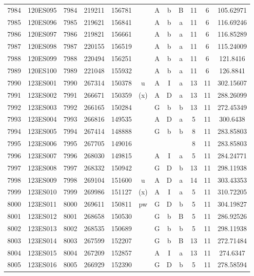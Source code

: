 \begin{tabular}{|*{12}{c|}}
7984 & 120ES095 & 7984 & 219211 & 156781 &  & A & b & B & 11 & 6 & 105.62971 \\ 
7985 & 120ES096 & 7985 & 219621 & 156841 &  & A & b & a & 11 & 6 & 116.69246 \\ 
7986 & 120ES097 & 7986 & 219821 & 156661 &  & A & b & a & 11 & 6 & 116.85289 \\ 
7987 & 120ES098 & 7987 & 220155 & 156519 &  & A & b & a & 11 & 6 & 115.24009 \\ 
7988 & 120ES099 & 7988 & 220494 & 156251 &  & A & b & a & 11 & 6 & 121.8416 \\ 
7989 & 120ES100 & 7989 & 221048 & 155932 &  & A & b & a & 11 & 6 & 126.8841 \\ 
7990 & 123ES001 & 7990 & 267314 & 150378 & u & A & I & a & 13 & 11 & 302.15607 \\ 
7991 & 123ES002 & 7991 & 266671 & 150359 & (x) & A & D & a & 13 & 11 & 288.26099 \\ 
7992 & 123ES003 & 7992 & 266165 & 150284 &  & G & b & b & 13 & 11 & 272.45349 \\ 
7993 & 123ES004 & 7993 & 266816 & 149535 &  & A & D & a & 5 & 11 & 300.6438 \\ 
7994 & 123ES005 & 7994 & 267414 & 148888 &  & G & b & b & 8 & 11 & 283.85803 \\ 
7995 & 123ES006 & 7995 & 267705 & 149016 &  &  &  &  & 8 & 11 & 283.85803 \\ 
7996 & 123ES007 & 7996 & 268030 & 149815 &  & A & I & a & 5 & 11 & 284.24771 \\ 
7997 & 123ES008 & 7997 & 268332 & 150942 &  & G & D & b & 13 & 11 & 298.11938 \\ 
7998 & 123ES009 & 7998 & 269104 & 151600 & u & A & D & a & 14 & 11 & 303.43353 \\ 
7999 & 123ES010 & 7999 & 269986 & 151127 & (x) & A & I & a & 5 & 11 & 310.72205 \\ 
8000 & 123ES011 & 8000 & 269611 & 150811 & pw & G & D & b & 5 & 11 & 304.19827 \\ 
8001 & 123ES012 & 8001 & 268658 & 150530 &  & G & b & B & 5 & 11 & 286.92526 \\ 
8002 & 123ES013 & 8002 & 268535 & 150689 &  & G & b & b & 5 & 11 & 298.11938 \\ 
8003 & 123ES014 & 8003 & 267599 & 152207 &  & G & b & B & 13 & 11 & 272.71484 \\ 
8004 & 123ES015 & 8004 & 267209 & 152857 &  & A & I & a & 13 & 11 & 274.6347 \\ 
8005 & 123ES016 & 8005 & 266929 & 152390 &  & G & D & b & 5 & 11 & 278.58594 \\ 

\end{tabular}
